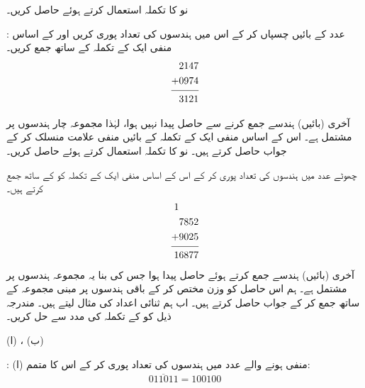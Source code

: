 نو کا  تکملہ    استعمال کرتے ہوئے     حاصل کریں۔ 

:\quad
  عدد    کے بائیں  چسپاں کر کے  اس میں  ہندسوں کی تعداد  پوری کریں اور   کے اساس منفی ایک کے  تکملہ کے ساتھ جمع کریں۔
  \begin{align*}
  \begin{split}
  2147&\\
  +0974&\\
  \noalign{\smallskip}\hline\noalign{\smallskip}
  3121&
  \end{split}
  \end{align*}

آخری  (بائیں) ہندسے جمع کرنے  سے  حاصل  پیدا نہیں ہوا، لہٰذا مجموعہ  چار ہندسوں پر مشتمل ہے۔ اس کے  اساس منفی ایک کے   تکملہ  کے بائیں منفی علامت منسلک کر کے  جواب  حاصل کرتے ہیں۔
نو کا  تکملہ    استعمال کرتے ہوئے     حاصل کریں۔ 

\quad
چھوٹے عدد  میں ہندسوں کی تعداد پوری کر کے اس کے اساس منفی ایک کے     تکملہ      کو  کے ساتھ جمع کرتے ہیں۔
 \begin{align*}
  \begin{split}
  1\phantom{7852}&\\
  7852&\\
  +9025&\\
  \noalign{\smallskip}\hline\noalign{\smallskip}
  16877&
  \end{split}
  \end{align*}
  آخری (بائیں) ہندسے جمع کرتے ہوئے حاصل  پیدا ہوا جس کی بنا یہ مجموعہ  ہندسوں پر مشتمل ہے۔ ہم اس حاصل  کو وزن  مختص کر کے باقی  ہندسوں پر مبنی مجموعہ  کے ساتھ جمع کر کے جواب  حاصل کرتے ہیں۔
اب ہم ثنائی اعداد کی مثال لیتے ہیں۔
 مندرجہ ذیل  کو   کے تکملہ    کی مدد سے حل کریں۔

(ا) ،  (ب)  

:\quad
 (ا)  منفی ہونے والے عدد میں ہندسوں کی تعداد پوری کر کے اس کا  متمم:
 \begin{align*}
 \overline{011011}=100100
 \end{align*}

